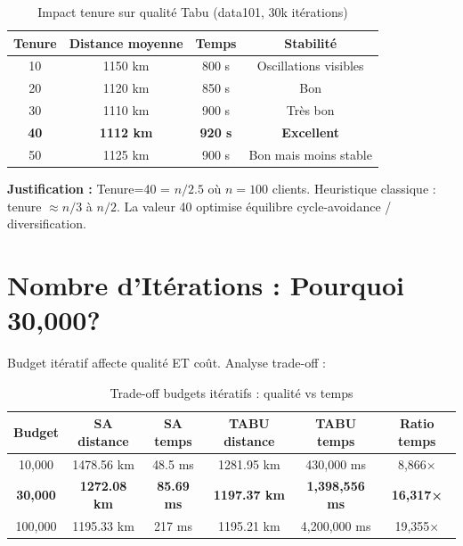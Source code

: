 \documentclass[12pt,a4paper,twoside]{report}
\begin{document}
\begin{table}[H]
    \centering
    \caption{Impact tenure sur qualité Tabu (data101, 30k itérations)}
    \begin{tabular}{|c|c|c|c|}
        \hline
        \textbf{Tenure} & \textbf{Distance moyenne} & \textbf{Temps} & \textbf{Stabilité}    \\
        \hline
        10              & 1150 km                   & 800 s          & Oscillations visibles \\
        20              & 1120 km                   & 850 s          & Bon                   \\
        30              & 1110 km                   & 900 s          & Très bon              \\
        \textbf{40}     & \textbf{1112 km}          & \textbf{920 s} & \textbf{Excellent}    \\
        50              & 1125 km                   & 900 s          & Bon mais moins stable \\
        \hline
    \end{tabular}
\end{table}

\textbf{Justification :} Tenure=40 = $n/2.5$ où $n=100$ clients. Heuristique classique : tenure $\approx n/3$ à $n/2$. La valeur 40 optimise équilibre cycle-avoidance / diversification.

\section{Nombre d'Itérations : Pourquoi 30,000?}

Budget itératif affecte qualité ET coût. Analyse trade-off :

\begin{table}[H]
    \centering
    \caption{Trade-off budgets itératifs : qualité vs temps}
    \begin{tabular}{|c|c|c|c|c|c|}
        \hline
        \textbf{Budget} & \textbf{SA distance} & \textbf{SA temps} & \textbf{TABU distance} & \textbf{TABU temps}   & \textbf{Ratio temps} \\
        \hline
        10,000          & 1478.56 km           & 48.5 ms           & 1281.95 km             & 430,000 ms            & 8,866×               \\
        \textbf{30,000} & \textbf{1272.08 km}  & \textbf{85.69 ms} & \textbf{1197.37 km}    & \textbf{1,398,556 ms} & \textbf{16,317×}     \\
        100,000         & 1195.33 km           & 217 ms            & 1195.21 km             & 4,200,000 ms          & 19,355×              \\
        \hline
    \end{tabular}
\end{table}
\end{document}
